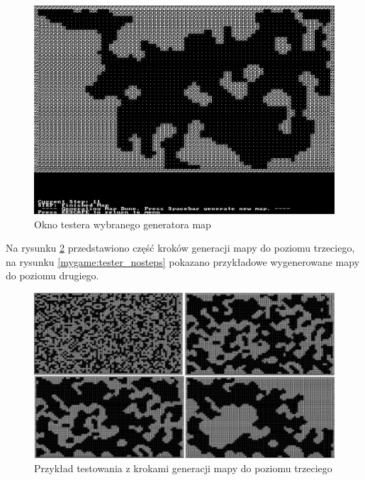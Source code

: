 \documentclass[12pt,twoside]{article}
\begin{document}
\FloatBarrier
\begin{figure}[ht]
	\centering
	\includegraphics[width=14cm]{images/mygame/window_tester.png}
	\caption{Okno testera wybranego generatora map}
	\label{mygame:window_tester}
\end{figure}
\FloatBarrier

Na rysunku \ref{mygame:tester_steps} przedstawiono część kroków generacji mapy do poziomu trzeciego, na rysunku \ref{mygame:tester_nosteps} pokazano przykładowe wygenerowane mapy do poziomu drugiego.

\FloatBarrier
\begin{figure}[ht]
	\centering
	\includegraphics[width=16cm]{images/mygame/tester_steps.png}
	\caption{Przykład testowania z krokami generacji mapy do poziomu trzeciego}
	\label{mygame:tester_steps}
\end{figure}
\FloatBarrier
\end{document}
